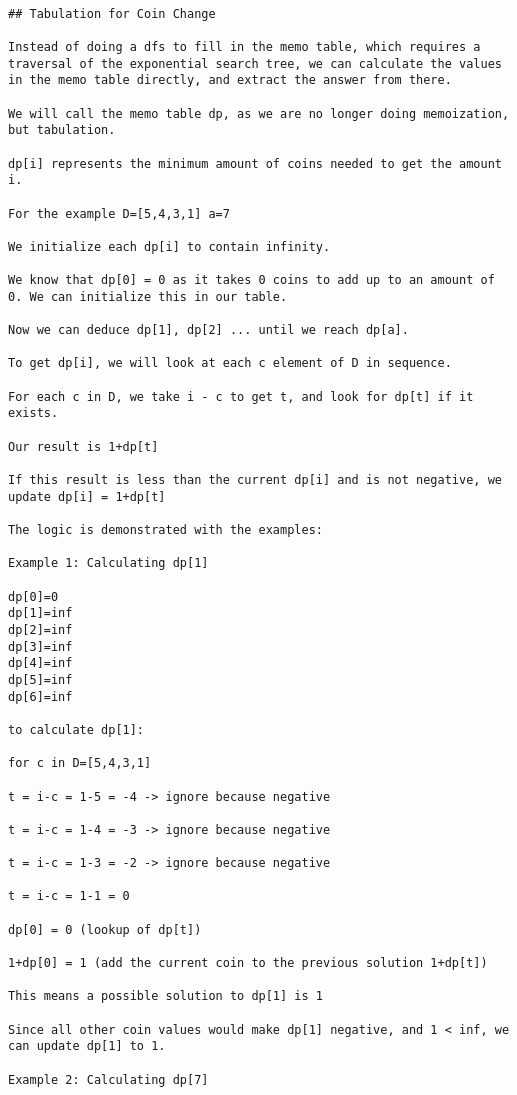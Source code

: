 \begin{verbatim}

## Tabulation for Coin Change

Instead of doing a dfs to fill in the memo table, which requires a traversal of the exponential search tree, we can calculate the values in the memo table directly, and extract the answer from there.

We will call the memo table dp, as we are no longer doing memoization, but tabulation.

dp[i] represents the minimum amount of coins needed to get the amount i.

For the example D=[5,4,3,1] a=7

We initialize each dp[i] to contain infinity.

We know that dp[0] = 0 as it takes 0 coins to add up to an amount of 0. We can initialize this in our table.

Now we can deduce dp[1], dp[2] ... until we reach dp[a].

To get dp[i], we will look at each c element of D in sequence.

For each c in D, we take i - c to get t, and look for dp[t] if it exists.

Our result is 1+dp[t]

If this result is less than the current dp[i] and is not negative, we update dp[i] = 1+dp[t]

The logic is demonstrated with the examples:

Example 1: Calculating dp[1]

dp[0]=0
dp[1]=inf
dp[2]=inf
dp[3]=inf
dp[4]=inf
dp[5]=inf
dp[6]=inf

to calculate dp[1]:

for c in D=[5,4,3,1]

t = i-c = 1-5 = -4 -> ignore because negative

t = i-c = 1-4 = -3 -> ignore because negative

t = i-c = 1-3 = -2 -> ignore because negative

t = i-c = 1-1 = 0

dp[0] = 0 (lookup of dp[t])

1+dp[0] = 1 (add the current coin to the previous solution 1+dp[t])

This means a possible solution to dp[1] is 1

Since all other coin values would make dp[1] negative, and 1 < inf, we can update dp[1] to 1.

Example 2: Calculating dp[7]


\end{verbatim}
